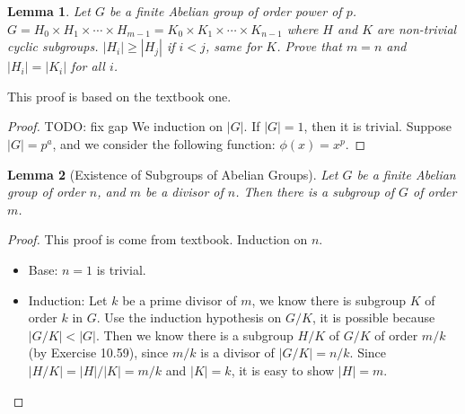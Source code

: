 \documentclass[14pt]{extarticle}
\newtheorem{lemma}{Lemma}[section]
\newcommand{\join}[3][,]{#2_0 #1 #2_1 #1 \cdots #1 #2_{#3}}
\newcommand{\1}{\{e\}}
\begin{document}
\begin{lemma}
  Let $G$ be a finite Abelian group of order power of $p$.
  $G = \join[\times]{H}{m - 1} = \join[\times]{K}{n - 1}$
  where $H$ and $K$ are non-trivial cyclic subgroups.
  $|H_i| \geq |H_j|$ if $i < j$, same for $K$.
  Prove that $m = n$ and $|H_i| = |K_i|$ for all $i$.
\end{lemma}
This proof is based on the textbook one.
\begin{proof}
  TODO: fix gap
  We induction on $|G|$. If $|G| = 1$, then it is trivial.
  Suppose $|G| = p^a$, and we consider the following function: $\phi(x) = x^p$.
\end{proof}

\begin{lemma}[Existence of Subgroups of Abelian Groups]
  Let $G$ be a finite Abelian group of order $n$, and $m$ be a divisor of $n$.
  Then there is a subgroup of $G$ of order $m$.
\end{lemma}
\begin{proof}
  This proof is come from textbook.
  Induction on $n$.
  \begin{itemize}
    \item Base: $n = 1$ is trivial.
    \item Induction: Let $k$ be a prime divisor of $m$, we know there is subgroup
      $K$ of order $k$ in $G$.
      Use the induction hypothesis on $G/K$, it is possible because $|G/K| < |G|$.
      Then we know there is a subgroup $H/K$ of $G/K$ of order $m/k$
      (by Exercise 10.59), since $m/k$ is
      a divisor of $|G/K| = n/k$. Since $|H/K| = |H|/|K| = m/k$ and $|K| = k$,
      it is easy to show $|H| = m$.
  \end{itemize}
\end{proof}
\end{document}
